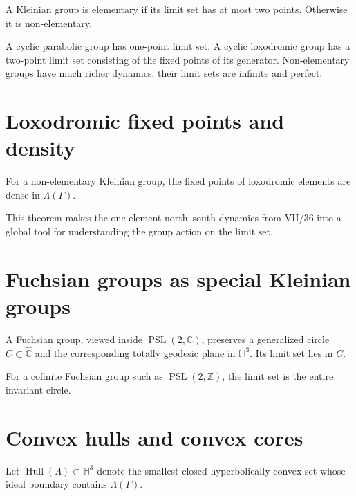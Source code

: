 \begin{definition}\label{def:vii37-elementary}
A Kleinian group is elementary if its limit set has at most two points.  Otherwise it is non-elementary.
\end{definition}

A cyclic parabolic group has one-point limit set.  A cyclic loxodromic group has a two-point limit set consisting of the fixed points of its generator.  Non-elementary groups have much richer dynamics; their limit sets are infinite and perfect.


\section{Loxodromic fixed points and density}

\begin{theorem}\label{thm:vii37-lox-density}
For a non-elementary Kleinian group, the fixed points of loxodromic elements are dense in \(\Lambda(\Gamma)\).
\end{theorem}

This theorem makes the one-element north--south dynamics from VII/36 into a global tool for understanding the group action on the limit set.


\section{Fuchsian groups as special Kleinian groups}

A Fuchsian group, viewed inside \(\operatorname{PSL}(2,\mathbb C)\), preserves a generalized circle \(C\subset\widehat{\mathbb C}\) and the corresponding totally geodesic plane in \(\mathbb H^3\).  Its limit set lies in \(C\).

\begin{example}\label{ex:vii37-first-kind}
For a cofinite Fuchsian group such as \(\operatorname{PSL}(2,\mathbb Z)\), the limit set is the entire invariant circle.
\end{example}


\section{Convex hulls and convex cores}

Let \(\operatorname{Hull}(\Lambda)\subset\mathbb H^3\) denote the smallest closed hyperbolically convex set whose ideal boundary contains \(\Lambda(\Gamma)\).

